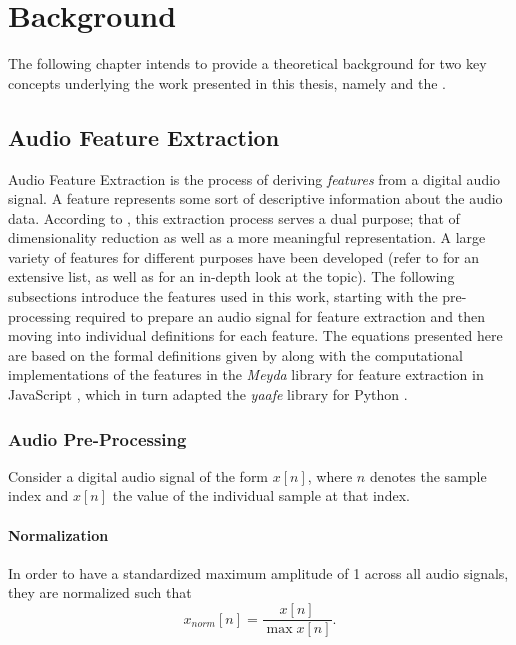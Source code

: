 
\section{Background}
\label{sec:background}
The following chapter intends to provide a theoretical background for two key
concepts underlying the work presented in this thesis, namely
 and the .

\subsection{Audio Feature Extraction}
\label{subsec:feature_extraction}
Audio Feature Extraction is the process of deriving \textit{features} from a
digital audio signal. A feature represents some sort of descriptive information
about the audio data. According to \citet{lerch2012}, this extraction process
serves a dual purpose; that of dimensionality reduction as well as a more
meaningful representation. A large variety of features for different purposes
have been developed (refer to \citet{peeters2004} for an extensive list, as well
as \citet{lerch2012} for an in-depth look at the topic). The following
subsections introduce the features used in this work, starting with the
pre-processing required to prepare an audio signal for feature extraction and
then moving into individual definitions for each feature. The equations
presented here are based on the formal definitions given by \citet{lerch2012}
along with the computational implementations of the features in the
\textit{Meyda} library for feature extraction in JavaScript
\citep{rawlinson2015}, which in turn adapted the \textit{yaafe} library for
Python \citep{mathieu2010}.

\subsubsection{Audio Pre-Processing}
\label{subsubsec:preprocessing}
Consider a digital audio signal of the form $x[n]$, where $n$ denotes the sample
index and $x[n]$ the value of the individual sample at that index.

\paragraph{Normalization}
\label{para:normalization}
In order to have a standardized maximum amplitude of 1 across all audio signals,
they are normalized such that
\begin{equation}
  x_{norm}[n] = \frac{x[n]}{\max{x[n]}}.
\end{equation}

